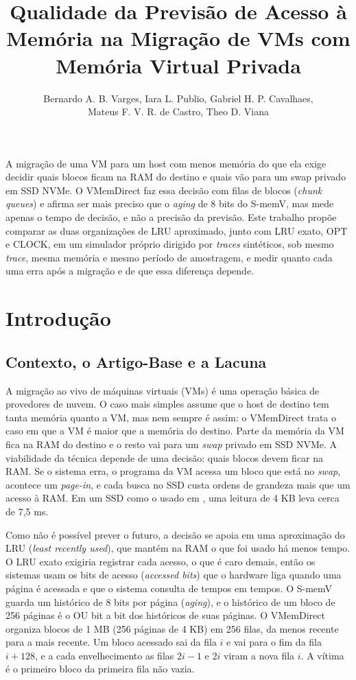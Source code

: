 \documentclass[12pt]{article}
\title{Qualidade da Previsão de Acesso à Memória na Migração de VMs com Memória Virtual Privada}
\author{Bernardo A. B. Varges\inst{1}, Iara L. Publio\inst{1}, Gabriel H. P. Cavalhaes\inst{1}, \\
Mateus F. V. R. de Castro\inst{1}, Theo D. Viana\inst{1}}
\begin{document}
\maketitle

\begin{resumo}
A migração de uma VM para um host com menos memória do que ela exige decidir quais blocos ficam na RAM do destino e quais vão para um swap privado em SSD NVMe. O VMemDirect faz essa decisão com filas de blocos (\textit{chunk queues}) e afirma ser mais preciso que o \textit{aging} de 8 bits do S-memV, mas mede apenas o tempo de decisão, e não a precisão da previsão. Este trabalho propõe comparar as duas organizações de LRU aproximado, junto com LRU exato, OPT e CLOCK, em um simulador próprio dirigido por \textit{traces} sintéticos, sob mesmo \textit{trace}, mesma memória e mesmo período de amostragem, e medir quanto cada uma erra após a migração e de que essa diferença depende.
\end{resumo}

\section{Introdução}

\subsection{Contexto, o Artigo-Base e a Lacuna}

A migração ao vivo de máquinas virtuais (VMs) é uma operação básica de provedores de nuvem. O caso mais simples assume que o host de destino tem tanta memória quanto a VM, mas nem sempre é assim: o VMemDirect \cite{muraoka2023vmemdirect} trata o caso em que a VM é maior que a memória do destino. Parte da memória da VM fica na RAM do destino e o resto vai para um \textit{swap} privado em SSD NVMe. A viabilidade da técnica depende de uma decisão: quais blocos devem ficar na RAM. Se o sistema erra, o programa da VM acessa um bloco que está no \textit{swap}, acontece um \textit{page-in}, e cada busca no SSD custa ordens de grandeza mais que um acesso à RAM. Em um SSD como o usado em \cite{suetake2018smemv}, uma leitura de 4 KB leva cerca de 7,5 ms.

Como não é possível prever o futuro, a decisão se apoia em uma aproximação do LRU (\textit{least recently used}), que mantém na RAM o que foi usado há menos tempo. O LRU exato exigiria registrar cada acesso, o que é caro demais, então os sistemas usam os bits de acesso (\textit{accessed bits}) que o hardware liga quando uma página é acessada e que o sistema consulta de tempos em tempos. O S-memV \cite{suetake2018smemv} guarda um histórico de 8 bits por página (\textit{aging}), e o histórico de um bloco de 256 páginas é o OU bit a bit dos históricos de suas páginas. O VMemDirect organiza blocos de 1 MB (256 páginas de 4 KB) em 256 filas, da menos recente para a mais recente. Um bloco acessado sai da fila $i$ e vai para o fim da fila $i+128$, e a cada envelhecimento as filas $2i-1$ e $2i$ viram a nova fila $i$. A vítima é o primeiro bloco da primeira fila não vazia.
\end{document}
